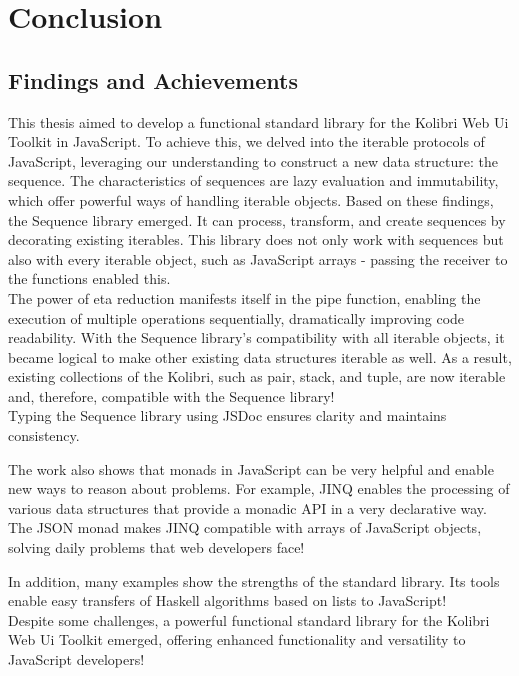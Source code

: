 \section{Conclusion}
\label{sec:conclusion}
\subsection{Findings and Achievements}
\label{sub:Findings and Achievements}
This thesis aimed to develop a functional standard library for the Kolibri Web
Ui Toolkit in JavaScript. To achieve this, we delved into the iterable
protocols of JavaScript, leveraging our understanding to construct a new data
structure: the sequence. The characteristics of sequences are lazy evaluation
and immutability, which offer powerful ways of handling iterable objects. Based
on these findings, the Sequence library emerged. It can process, transform, and
create sequences by decorating existing iterables. This library does not only
work with sequences but also with every iterable object, such as JavaScript
arrays - passing the receiver to the functions enabled this.\\
The power of eta reduction manifests itself in the pipe function, enabling the
execution of multiple operations sequentially, dramatically improving code
readability. With the Sequence library’s compatibility with all iterable
objects, it became logical to make other existing data structures iterable as
well. As a result, existing collections of the Kolibri, such as pair, stack,
and tuple, are now iterable and, therefore, compatible with the Sequence
library!\\
Typing the Sequence library using JSDoc ensures clarity and maintains
consistency.

The work also shows that monads in JavaScript can be very helpful and enable
new ways to reason about problems. For example, JINQ enables the processing of
various data structures that provide a monadic API in a very declarative way.
The JSON monad makes JINQ compatible with arrays of JavaScript objects, solving
daily problems that web developers face!

In addition, many examples show the strengths of the standard library. Its
tools enable easy transfers of Haskell algorithms based on lists
to JavaScript!\\
Despite some challenges, a powerful functional standard library for the Kolibri
Web Ui Toolkit emerged, offering enhanced functionality and versatility to
JavaScript developers!\\
